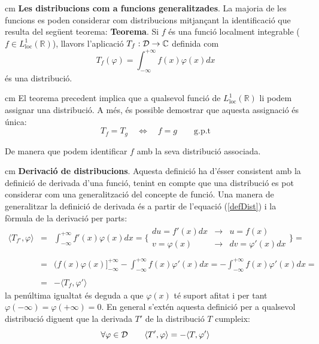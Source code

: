 \documentclass{article}
\def\R{\mathbb R}
\def\C{\mathbb C}
\begin{document}
 cm
\noindent
\textbf{Les distribucions com a funcions generalitzades}. La majoria
de les funcions es poden considerar com distribucions mitjan\c{c}ant
la identificaci\'o que resulta del seg\"uent teorema:
\newline
\noindent
\textbf{Teorema}. Si $f$ \'es una funci\'o localment integrable 
($f \in L^1_{\mathrm{loc}}(\R)$), llavors l'aplicaci\'o 
$T_f:{\cal D} \rightarrow \C$ definida com
\begin{equation}
\label{defDist}
T_f(\varphi)=\int_{-\infty}^{+\infty} f(x) \varphi(x) dx
\end{equation}
\noindent
\'es una distribuci\'o.

 cm
El teorema precedent implica que a qualsevol funci\'o de 
$L^1_{\mathrm{loc}}(\R)$ li podem assignar una distribuci\'o. A m\'es,
\'es possible demostrar que aquesta assignaci\'o \'es \'unica:
\begin{equation}
T_f = T_g  \quad  \Longleftrightarrow \quad f=g \qquad \mathrm{g.p.t}
\end{equation}
 
\noindent
De manera que podem identificar $f$ amb la seva distribuci\'o associada.

 cm
\noindent
\textbf{Derivaci\'o de distribucions}. Aquesta definici\'o ha d'\'esser
consistent amb la definici\'o de derivada d'una funci\'o, tenint en
compte que una distribuci\'o es pot considerar com una generalitzaci\'o
del concepte de funci\'o.
Una manera de generalitzar la definici\'o de derivada \'es a partir
de l'equaci\'o (\ref{defDist}) i la f\`ormula de la derivaci\'o per parts:
\begin{equation}
\label{eqDeriv}
\begin{array}{lcl}
\langle T_{f'}, \varphi \rangle & = & 
\int_{-\infty}^{+\infty} f'(x) \varphi(x) dx =
\{
\begin{array}{lcl}
du=f'(x) dx & \rightarrow & u=f(x)\\
v=\varphi(x)   & \rightarrow & dv=\varphi'(x) dx
\end{array}
\} = \\
\\
   & = &
(f(x) \varphi(x) ]_{-\infty}^{+\infty} -
\int_{-\infty}^{+\infty} f(x) \varphi'(x) dx=
- \int_{-\infty}^{+\infty} f(x) \varphi'(x) dx= \\
\\
   & = & - \langle T_f, \varphi' \rangle
\end{array}
\end{equation}
\noindent
la pen\'ultima igualtat \'es deguda a que $\varphi(x)$ t\'e suport afitat
i per tant $\varphi(-\infty)=\varphi(+\infty)=0$.
\newline
En general s'ext\'en aquesta definici\'o per a qualsevol distribuci\'o
diguent que la derivada $T'$ de la distribuci\'o $T$ cumpleix:
\[
\forall \varphi \in {\cal D} \qquad \langle T', \varphi \rangle = 
- \langle T, \varphi' \rangle
\]
\end{document}
